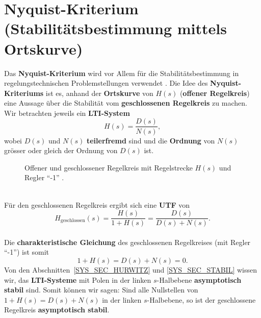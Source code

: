 {\section{Nyquist-Kriterium (Stabilit\"atsbestimmung mittels Ortskurve)}\label{NYQ-KRIT}
Das {\bf Nyquist-Kriterium} wird vor Allem f\"ur die Stabilit\"atsbestimmung in regelungstechnischen Problemstellungen verwendet \cite{UNB:81}. Die Idee des {\bf Nyquist-Kriteriums} ist es, anhand der {\bf Ortskurve} von $H(s)$ ({\bf offener Regelkreis}) eine Aussage \"uber die Stabilit\"at vom {\bf geschlossenen Regelkreis} zu machen. Wir betrachten jeweils ein {\bf LTI-System} 
\begin{equation*}
  H(s)=\frac{D(s)}{N(s)},
\end{equation*}
wobei $D(s)$ und $N(s)$ {\bf teilerfremd} sind und die
{\bf Ordnung} von $N(s)$ gr\"osser oder gleich der
Ordnung von $D(s)$ ist.\\ 
\begin{figure}[!htb]
\vspace*{-2mm}
\begin{center}
  \vspace*{-3mm}\caption{Offener und geschlossener Regelkreis mit Regelstrecke $H(s)$ und Regler ``-1'' \cite{WOS:88}.}
\end{center}
\vspace*{-6mm}
\end{figure}\\
F\"ur den geschlossenen Regelkreis ergibt sich eine {\bf UTF} von 
\begin{equation*}
  H_{\text{geschlossen}}(s)=\frac{H(s)}{1+H(s)}=\frac{D(s)}{D(s)+N(s)}.
\end{equation*}\\
Die {\bf charakteristische Gleichung} des 
 geschlossenen Regelkreises (mit Regler  ``-1'') ist somit
\begin{equation*}
  1+H(s)=D(s)+N(s)=0.
\end{equation*}
Von den Abschnitten~\ref{SYS_SEC_HURWITZ} und \ref{SYS_SEC_STABIL} wissen wir, das {\bf LTI-Systeme} mit Polen in der linken $s$-Halbebene {\bf asymptotisch stabil} sind. Somit k\"onnen wir sagen: Sind alle Nullstellen von  $1+H(s)=D(s)+N(s)$ in der linken $s$-Halbebene, so ist der geschlossene Regelkreis {\bf asymptotisch stabil}.\\
}
